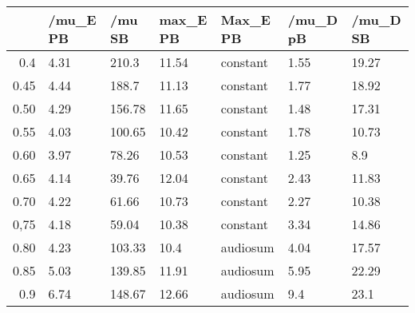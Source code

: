 \begin{table}[ht]
\centering
\begin{tabular}{rllllll}
  \hline
 & /mu\_E PB & /mu SB & max\_E PB & Max\_E PB & /mu\_D pB & /mu\_D SB \\ 
  \hline
0.4 & 4.31 & 210.3 & 11.54 & constant & 1.55 & 19.27 \\ 
  0.45 & 4.44 & 188.7 & 11.13 & constant & 1.77 & 18.92 \\ 
  0.50 & 4.29 & 156.78 & 11.65 & constant & 1.48 & 17.31 \\ 
  0.55 & 4.03 & 100.65 & 10.42 & constant & 1.78 & 10.73 \\ 
  0.60 & 3.97 & 78.26 & 10.53 & constant & 1.25 & 8.9 \\ 
  0.65 & 4.14 & 39.76 & 12.04 & constant & 2.43 & 11.83 \\ 
  0.70 & 4.22 & 61.66 & 10.73 & constant & 2.27 & 10.38 \\ 
  0,75 & 4.18 & 59.04 & 10.38 & constant & 3.34 & 14.86 \\ 
  0.80 & 4.23 & 103.33 & 10.4 & audiosum & 4.04 & 17.57 \\ 
  0.85 & 5.03 & 139.85 & 11.91 & audiosum & 5.95 & 22.29 \\ 
  0.9 & 6.74 & 148.67 & 12.66 & audiosum & 9.4 & 23.1 \\ 
   \hline
\end{tabular}
\end{table}
